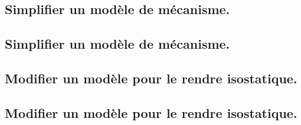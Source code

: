 \documentclass[10pt,fleqn]{book}
\newcommand{\repRel}{../..}
\newcommand{\repStyle}{\repRel/Style}
\newcommand{\td}{fichier_td}
\newcommand{\repExos}{\repRel/ExercicesCompetences}
\newcommand{\repExo}{dossier}
\begin{document}
\renewcommand{\repExo}{\repExos/B2_ProposerModele/B2_14_ModeliserAction_ModeleGlobal/517_MAM}
\renewcommand{\td}{517_MAM}
\graphicspath{{\repStyle/png/}{\repExo/images/}}


\renewcommand{\repExo}{\repExos/B2_ProposerModele/B2_14_ModeliserAction_ModeleGlobal/518_MAM}
\renewcommand{\td}{518_MAM}
\graphicspath{{\repStyle/png/}{\repExo/images/}}


\renewcommand{\repExo}{\repExos/B2_ProposerModele/B2_14_ModeliserAction_ModeleGlobal/519_MAM}
\renewcommand{\td}{519_MAM}
\graphicspath{{\repStyle/png/}{\repExo/images/}}


\renewcommand{\repExo}{\repExos/B2_ProposerModele/B2_14_ModeliserAction_ModeleGlobal/520_MAM}
\renewcommand{\td}{520_MAM}
\graphicspath{{\repStyle/png/}{\repExo/images/}}


\renewcommand{\repExo}{\repExos/B2_ProposerModele/B2_14_ModeliserAction_ModeleGlobal/521_MAM}
\renewcommand{\td}{521_MAM}
\graphicspath{{\repStyle/png/}{\repExo/images/}}


\subsection{Simplifier un modèle de mécanisme.} 

\subsection{Simplifier un modèle de mécanisme.} 

\subsection{Modifier un modèle pour le rendre isostatique.} 

\subsection{Modifier un modèle pour le rendre isostatique.} 

\renewcommand{\repExo}{\repExos/B2_ProposerModele/B2_16_Hyperstatisme/64_EPAS}
\renewcommand{\td}{64_EPAS}
\graphicspath{{\repStyle/png/}{\repExo/images/}}


\renewcommand{\repExo}{\repExos/B2_ProposerModele/B2_16_Hyperstatisme/69_TrainA350}
\renewcommand{\td}{69_TrainA350}
\graphicspath{{\repStyle/png/}{\repExo/images/}}

\end{document}

